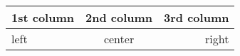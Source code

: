 \begin{tabular}{l|c|r}
  1st column & 2nd column & 3rd column \\\hline
  left & center & right \\
\end{tabular}
